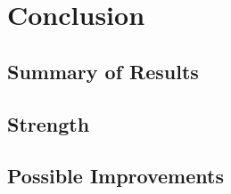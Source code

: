 \section{Conclusion}
\subsection{Summary of Results}
\subsection{Strength}
\subsection{Possible Improvements}